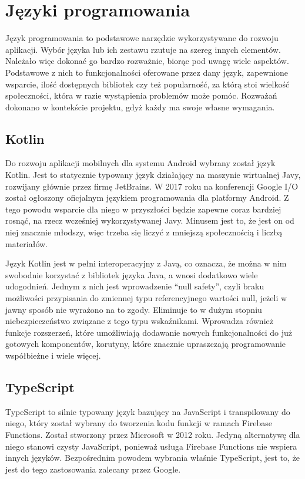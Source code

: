 \section{Języki programowania}

Język programowania to podstawowe narzędzie wykorzystywane do rozwoju aplikacji. Wybór języka lub ich zestawu rzutuje na szereg innych elementów. Należało więc dokonać go bardzo rozważnie, biorąc pod uwagę wiele aspektów. Podstawowe z nich to funkcjonalności oferowane przez dany język, zapewnione wsparcie, ilość dostępnych bibliotek czy też popularność, za którą stoi wielkość społeczności, która w razie wystąpienia problemów może pomóc. Rozważań dokonano w kontekście projektu, gdyż każdy ma swoje własne wymagania.

\subsection{Kotlin}
Do rozwoju aplikacji mobilnych dla systemu Android wybrany został język Kotlin. Jest to statycznie typowany język działający na maszynie wirtualnej Javy, rozwijany głównie przez firmę JetBrains. W 2017 roku na konferencji Google I/O został ogłoszony oficjalnym językiem programowania dla platformy Android. Z tego powodu wsparcie dla niego w przyszłości będzie zapewne coraz bardziej rosnąć, na rzecz wcześniej wykorzystywanej Javy. Minusem jest to, że jest on od niej znacznie młodszy, więc trzeba się liczyć z mniejszą społecznością i liczbą materiałów. 

Język Kotlin jest w pełni interoperacyjny z Javą, co oznacza, że można w nim swobodnie korzystać z bibliotek języka Java, a wnosi dodatkowo wiele udogodnień. Jednym z nich jest wprowadzenie \enquote{null safety}, czyli braku możliwości przypisania do zmiennej typu referencyjnego wartości null, jeżeli w jawny sposób nie wyrażono na to zgody. Eliminuje to w dużym stopniu niebezpieczeństwo związane z tego typu wskaźnikami. Wprowadza również funkcje rozszerzeń, które umożliwiają dodawanie nowych funkcjonalności do już gotowych komponentów, korutyny, które znacznie upraszczają programowanie współbieżne i wiele więcej.

\subsection{TypeScript}
TypeScript to silnie typowany język bazujący na JavaScript i transpilowany do niego, który został wybrany do tworzenia kodu funkcji w ramach Firebase Functions. Został stworzony przez Microsoft w 2012 roku. Jedyną alternatywę dla niego stanowi czysty JavaScript, ponieważ usługa Firebase Functions nie wspiera innych języków. Bezpośrednim powodem wybrania właśnie TypeScript, jest to, że jest do tego zastosowania zalecany przez Google.

